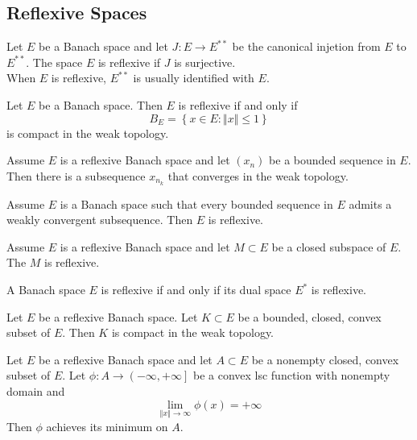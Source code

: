 \subsection{Reflexive Spaces}

\begin{defn}
Let $ E $ be a Banach space and let $ J: E \to E^{**} $ be the canonical injetion from $ E $ to $ E^{**} $. The space $ E $ is reflexive if $ J $ is surjective.\\
\indent When $ E $ is reflexive, $ E^{**} $ is usually identified with $ E $.
\end{defn}

\begin{thm}
Let $ E $ be a Banach space. Then $ E $ is reflexive if and only if
\[
B_{E} = \left\{ x \in E: \Vert x \Vert \leq 1 \right\}
\]
is compact in the weak topology.
\end{thm}


\begin{thm}
	Assume $ E $ is a reflexive Banach space and let $ (x_{n}) $ be a bounded sequence in $ E $. Then there is a subsequence $ x_{n_{k}} $ that converges in the weak topology.
\end{thm}

\begin{thm}
Assume $ E $ is a Banach space such that every bounded sequence in $ E $ admits a weakly convergent subsequence. Then $ E $ is reflexive.
\end{thm}

\begin{prop}
Assume $ E $ is a reflexive Banach space and let $ M \subset E $ be a closed subspace of $ E $. The $ M $ is reflexive.
\end{prop}

\begin{cor}
A Banach space $ E $ is reflexive if and only if its dual space $ E^{*} $ is reflexive.
\end{cor}

\begin{cor}
Let $ E $ be a reflexive Banach space. Let $ K \subset E $ be a bounded, closed, convex subset of $ E $. Then $ K $ is compact in the weak topology.
\end{cor}

\begin{cor}
	Let $ E $ be a reflexive Banach space and let $ A \subset E $ be a nonempty closed, convex subset of $ E $. Let $ \phi: A \to \left( -\infty, + \infty \right] $ be a convex lsc function with nonempty domain and
	\[
		\lim_{ \Vert x \Vert \to \infty} \phi(x) = + \infty
	\]
	Then $ \phi $ achieves its minimum on $ A $.
\end{cor}

